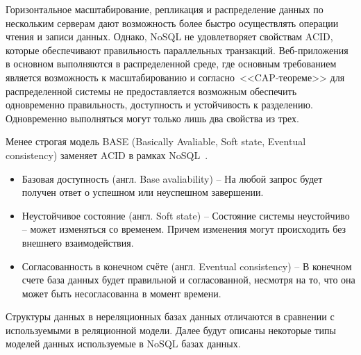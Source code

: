 Горизонтальное масштабирование, репликация и распределение данных по нескольким серверам
дают возможность более быстро осуществлять операции чтения и записи данных.
Однако, NoSQL не удовлетворяет свойствам ACID,
которые обеспечивают правильность параллельных транзакций.
{Веб-приложения} в основном выполняются в распределенной среде,
где основным требованием является возможность к масштабированию
и согласно~<<CAP-теореме>> для распределенной системы не предоставляется
возможным обеспечить одновременно
правильность, доступность и устойчивость к разделению. 
Одновременно выполняться могут только лишь два свойства из трех.

Менее строгая модель BASE (Basically Avaliable, Soft state, Eventual consistency) заменяет ACID в рамках NoSQL~\cite{nosql}.
\begin{itemize}[label=---]
    \item Базовая доступность (англ. Base avaliability) -- На любой запрос будет получен ответ о успешном или неуспешном завершении.
    \item Неустойчивое состояние (англ. Soft state) -- Состояние системы неустойчиво -- может изменяться со временем. 
    Причем изменения могут происходить без внешнего взаимодействия. 
    \item Согласованность в конечном счёте (англ. Eventual consistency) -- В конечном счете база данных будет правильной и согласованной, несмотря на то,
    что она может быть несогласованна в момент времени.
\end{itemize}

Структуры данных в нереляционных базах данных отличаются в сравнении с используемыми в реляционной модели.
Далее будут описаны некоторые типы моделей данных используемые в NoSQL базах данных.
\clearpage
